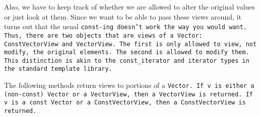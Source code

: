 Also, we have to 
keep track of whether we are allowed to alter the original values or
just look at them.  
Since we want to be able to pass these views around, it turns out that
the usual \tt{const}-ing doesn't work the way you would want.
Thus, there are two objects that are views of a
\tt{Vector}:
\tt{ConstVectorView} and \tt{VectorView}.  
The first is only allowed to view,
not modify, the original elements.  The second is allowed to modify them.
This distinction is akin to the \tt{const\_iterator} and \tt{iterator} types in the
standard template library.

The following methods return views to portions of a \tt{Vector}.
If \tt{v} is either a (non-\tt{const}) \tt{Vector}
or a \tt{VectorView}, then a \tt{VectorView} is returned.
If \tt{v} is a \tt{const Vector} or a \tt{ConstVectorView},
then a \tt{ConstVectorView} is returned.  

